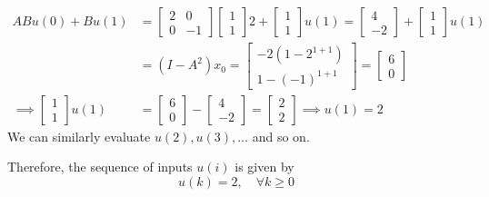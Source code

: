 \begin{align*}
    A B u(0) + B u(1)
     & =
    \left[\begin{array}{cc}
                  2 & 0  \\
                  0 & -1
              \end{array}\right]
    \left[\begin{array}{c}
                  1 \\
                  1
              \end{array}\right]
    2
    +
    \left[\begin{array}{c}
                  1 \\
                  1
              \end{array}\right]
    u(1)
    =
    \left[\begin{array}{c}
                  4 \\
                  -2
              \end{array}\right]
    +
    \left[\begin{array}{c}
                  1 \\
                  1
              \end{array}\right]
    u(1)
    \\ & =
    (I - A^2) x_0
    =
    \left[\begin{array}{c}
                  -2(1 - 2^{1 + 1}) \\
                  1 - (-1)^{1 + 1}
              \end{array}\right]
    =
    \left[\begin{array}{c}
                  6 \\
                  0
              \end{array}\right]
    \\
    \implies
    \left[\begin{array}{c}
                  1 \\
                  1
              \end{array}\right]
    u(1)
     & =
    \left[\begin{array}{c}
                  6 \\
                  0
              \end{array}\right]
    -
    \left[\begin{array}{c}
                  4 \\
                  -2
              \end{array}\right]
    =
    \left[\begin{array}{c}
                  2 \\
                  2
              \end{array}\right]
    \implies
    u(1)
    =
    2
\end{align*}
We can similarly evaluate \( u(2), u(3), \ldots \) and so on.

Therefore, the sequence of inputs \( u(i) \) is given by
\[
    \boxed{
        u(k) = 2, \quad \forall k \geq 0
    }
\]
